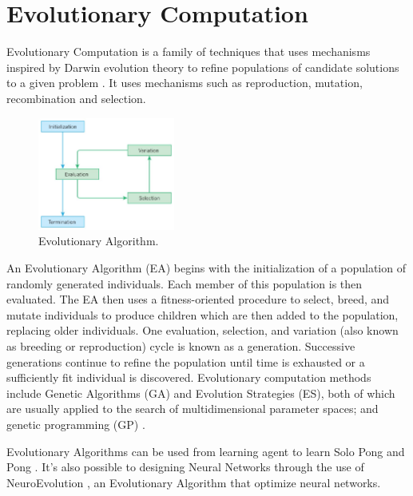 \section{Evolutionary Computation}
\label{sec:evolutionary-computation}
Evolutionary Computation is a family of techniques that uses mechanisms inspired by Darwin evolution theory to refine populations of candidate solutions to a given problem \cite{vikhar2016evolutionary}. It uses mechanisms such as reproduction, mutation, recombination and selection.

\begin{figure}[ht]
    \centering
    \includegraphics[width=0.4\textwidth]{images/Evolutionary_algorithms.jpg}
    \caption{Evolutionary Algorithm.}
\end{figure}

An Evolutionary Algorithm (EA) begins with the initialization of a population of randomly generated individuals. Each member of this population is then evaluated. 
The EA then uses a fitness-oriented procedure to select, breed, and mutate individuals to produce children which are then added to the population, replacing older individuals. One evaluation, selection, and variation (also known as breeding or reproduction) cycle is known as a generation. Successive generations continue to refine the population until time is exhausted or a sufficiently fit individual is discovered. Evolutionary computation methods include Genetic Algorithms (GA) and Evolution Strategies (ES), both of which are usually applied to the search of multidimensional parameter spaces; and genetic programming (GP) \cite{panait2005cooperative} \cite{vikhar2016evolutionary}.

Evolutionary Algorithms can be used from learning agent to learn Solo Pong \cite{langdon2005evolutionary} and Pong \cite{mcbrien2020learning}.
It's also possible to designing Neural Networks through the use of NeuroEvolution \cite{stanley2019designing}, an Evolutionary Algorithm that optimize neural networks.
